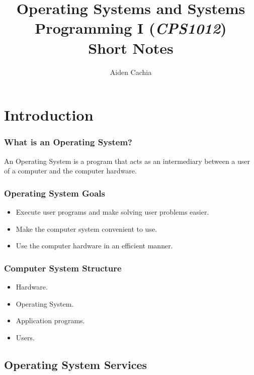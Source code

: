 \documentclass[]{article}
\begin{document}
\title{Operating Systems and Systems Programming I (\emph{CPS1012})\\ Short Notes}
\author{Aiden Cachia}
\date{}

\maketitle
\tableofcontents
\pagebreak

\section{Introduction}

\subsubsection*{What is an Operating System?}

An Operating System is a program that acts as an intermediary between a user of a computer and the computer hardware.

\subsubsection*{Operating System Goals}

\begin{itemize}
    \item Execute user programs and make solving user problems easier.
    \item Make the computer system convenient to use.
    \item Use the computer hardware in an efficient manner.
\end{itemize}

\subsubsection*{Computer System Structure}
\begin{itemize}
    \item Hardware.
    \item Operating System.
    \item Application programs.
    \item Users.
\end{itemize}

\subsection{Operating System Services}
\end{document}
